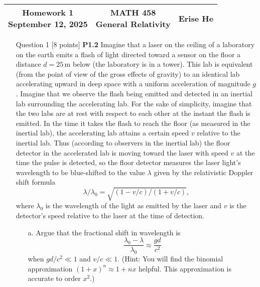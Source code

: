 \documentclass[12pt]{article}
\begin{document}
\thispagestyle{plain}
\vspace{-4ex}  %


\begin{center}
\begin{tabular}{*{3}{c}}
    \parbox[t]{0.3\linewidth}{\centering\textbf{Homework 1\\September 12, 2025}}
    & \parbox[t]{0.3\linewidth}{\centering\textbf{MATH 458\\General Relativity}}
    & \parbox[t]{0.3\linewidth}{\centering\textbf{Erise He}}\\[1em]
    \hline
\end{tabular}
\end{center}

\bigskip


\begin{enumerate}
  \item[Question 1] [8 points] \textbf{P1.2} Imagine that a laser on the ceiling of a laboratory on the earth emits a flash of light directed toward a sensor on the floor a distance $d = 25 \,\mathrm{m}$ below (the laboratory is in a tower). This lab is equivalent (from the point of view of the gross effects of gravity) to an identical lab accelerating upward in deep space with a uniform acceleration of magnitude $g$. Imagine that we observe the flash being emitted and detected in an inertial lab surrounding the accelerating lab. For the sake of simplicity, imagine that the two labs are at rest with respect to each other at the instant the flash is emitted. In the time it takes the flash to reach the floor (as measured in the inertial lab), the accelerating lab attains a certain speed $v$ relative to the inertial lab. Thus (according to observers in the inertial lab) the floor detector in the accelerated lab is moving toward the laser with speed $v$ at the time the pulse is detected, so the floor detector measures the laser light’s wavelength to be blue-shifted to the value $\lambda$ given by the relativistic Doppler shift formula
  \[
    \lambda/\lambda_0 = \sqrt{(1 - v/c)/(1 + v/c)} ,
  \]
  where $\lambda_0$ is the wavelength of the light as emitted by the laser and $v$ is the detector’s speed relative to the laser at the time of detection.
  \begin{enumerate}
    \item[a.] Argue that the fractional shift in wavelength is
    \[
      \frac{\lambda_0 - \lambda}{\lambda_0} \approx \frac{g d}{c^2}
    \]
    when $g d/c^2 \ll 1$ and $v/c \ll 1$. (Hint: You will find the binomial approximation $(1+x)^n \approx 1 + nx$ helpful. This approximation is accurate to order $x^2$.)

\end{enumerate}
\end{enumerate}
\end{document}
